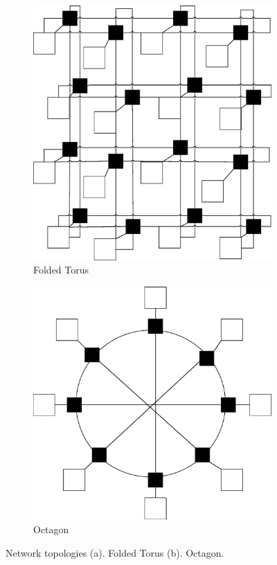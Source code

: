 \begin{figure}
\vspace{10mm}
\centering
\begin{subfigure}{.5\textwidth}
  \centering
  \includegraphics[width=.9\linewidth]{torusfolded.eps}
  \caption{Folded Torus}
  \label{fig:2.4a}
\end{subfigure}%
\begin{subfigure}{.5\textwidth}
  \centering
  \includegraphics[width=.9\linewidth]{octagon.eps}
  \caption{Octagon}
  \label{fig:2.4b}
\end{subfigure}
\caption[Folded Torus and Octagon]{Network topologies (a). Folded Torus (b). Octagon.}
\label{fig:2.4}
\vspace{10mm}
\end{figure}


